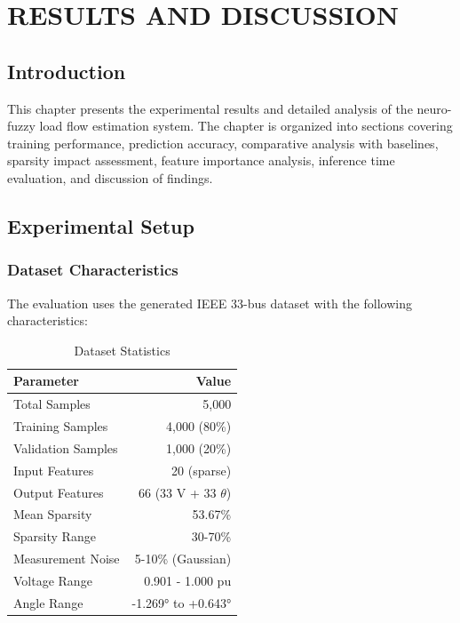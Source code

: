 \documentclass[12pt,a4paper]{report}
\begin{document}
\chapter{RESULTS AND DISCUSSION}

\section{Introduction}

This chapter presents the experimental results and detailed analysis of the neuro-fuzzy load flow estimation system. The chapter is organized into sections covering training performance, prediction accuracy, comparative analysis with baselines, sparsity impact assessment, feature importance analysis, inference time evaluation, and discussion of findings.

\section{Experimental Setup}

\subsection{Dataset Characteristics}

The evaluation uses the generated IEEE 33-bus dataset with the following characteristics:

\begin{table}[ht]
\centering
\caption{Dataset Statistics}
\label{tab:dataset_stats}
\begin{tabular}{lr}
\toprule
\textbf{Parameter} & \textbf{Value} \\
\midrule
Total Samples & 5,000 \\
Training Samples & 4,000 (80\%) \\
Validation Samples & 1,000 (20\%) \\
Input Features & 20 (sparse) \\
Output Features & 66 (33 V + 33 $\theta$) \\
Mean Sparsity & 53.67\% \\
Sparsity Range & 30-70\% \\
Measurement Noise & 5-10\% (Gaussian) \\
\midrule
Voltage Range & 0.901 - 1.000 pu \\
Angle Range & -1.269° to +0.643° \\
\bottomrule
\end{tabular}
\end{table}
\end{document}
